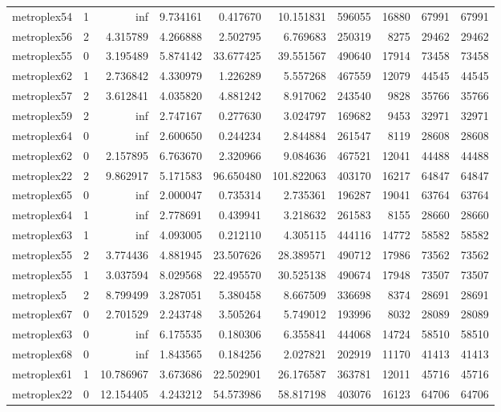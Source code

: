 \begin{longtable}{|l|r|r|r|r|r|r|r|r|r|}
metroplex54 & 1 & inf & 9.734161 & 0.417670 & 10.151831 & 596055 & 16880 & 67991 & 67991 \\
metroplex56 & 2 & 4.315789 & 4.266888 & 2.502795 & 6.769683 & 250319 & 8275 & 29462 & 29462 \\
metroplex55 & 0 & 3.195489 & 5.874142 & 33.677425 & 39.551567 & 490640 & 17914 & 73458 & 73458 \\
metroplex62 & 1 & 2.736842 & 4.330979 & 1.226289 & 5.557268 & 467559 & 12079 & 44545 & 44545 \\
metroplex57 & 2 & 3.612841 & 4.035820 & 4.881242 & 8.917062 & 243540 & 9828 & 35766 & 35766 \\
metroplex59 & 2 & inf & 2.747167 & 0.277630 & 3.024797 & 169682 & 9453 & 32971 & 32971 \\
metroplex64 & 0 & inf & 2.600650 & 0.244234 & 2.844884 & 261547 & 8119 & 28608 & 28608 \\
metroplex62 & 0 & 2.157895 & 6.763670 & 2.320966 & 9.084636 & 467521 & 12041 & 44488 & 44488 \\
metroplex22 & 2 & 9.862917 & 5.171583 & 96.650480 & 101.822063 & 403170 & 16217 & 64847 & 64847 \\
metroplex65 & 0 & inf & 2.000047 & 0.735314 & 2.735361 & 196287 & 19041 & 63764 & 63764 \\
metroplex64 & 1 & inf & 2.778691 & 0.439941 & 3.218632 & 261583 & 8155 & 28660 & 28660 \\
metroplex63 & 1 & inf & 4.093005 & 0.212110 & 4.305115 & 444116 & 14772 & 58582 & 58582 \\
metroplex55 & 2 & 3.774436 & 4.881945 & 23.507626 & 28.389571 & 490712 & 17986 & 73562 & 73562 \\
metroplex55 & 1 & 3.037594 & 8.029568 & 22.495570 & 30.525138 & 490674 & 17948 & 73507 & 73507 \\
metroplex5 & 2 & 8.799499 & 3.287051 & 5.380458 & 8.667509 & 336698 & 8374 & 28691 & 28691 \\
metroplex67 & 0 & 2.701529 & 2.243748 & 3.505264 & 5.749012 & 193996 & 8032 & 28089 & 28089 \\
metroplex63 & 0 & inf & 6.175535 & 0.180306 & 6.355841 & 444068 & 14724 & 58510 & 58510 \\
metroplex68 & 0 & inf & 1.843565 & 0.184256 & 2.027821 & 202919 & 11170 & 41413 & 41413 \\
metroplex61 & 1 & 10.786967 & 3.673686 & 22.502901 & 26.176587 & 363781 & 12011 & 45716 & 45716 \\
metroplex22 & 0 & 12.154405 & 4.243212 & 54.573986 & 58.817198 & 403076 & 16123 & 64706 & 64706 \\

\end{longtable}
